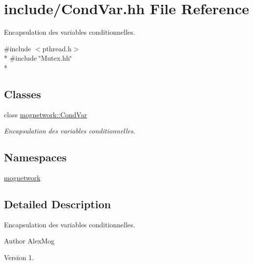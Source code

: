 \hypertarget{_cond_var_8hh}{\section{include/\-Cond\-Var.hh File Reference}
\label{_cond_var_8hh}
}


Encapsulation des variables conditionnelles.  


{\ttfamily \#include $<$pthread.\-h$>$}\\*
{\ttfamily \#include \char`\"{}Mutex.\-hh\char`\"{}}\\*
\subsection*{Classes}
\begin{DoxyCompactItemize}
\item 
class \hyperlink{classmognetwork_1_1_cond_var}{mognetwork\-::\-Cond\-Var}
\begin{DoxyCompactList}\small\item\em Encapsulation des variables conditionnelles. \end{DoxyCompactList}\end{DoxyCompactItemize}
\subsection*{Namespaces}
\begin{DoxyCompactItemize}
\item 
\hyperlink{namespacemognetwork}{mognetwork}
\end{DoxyCompactItemize}


\subsection{Detailed Description}
Encapsulation des variables conditionnelles. \begin{DoxyAuthor}{Author}
Alex\-Mog 
\end{DoxyAuthor}
\begin{DoxyVersion}{Version}
1. 
\end{DoxyVersion}
